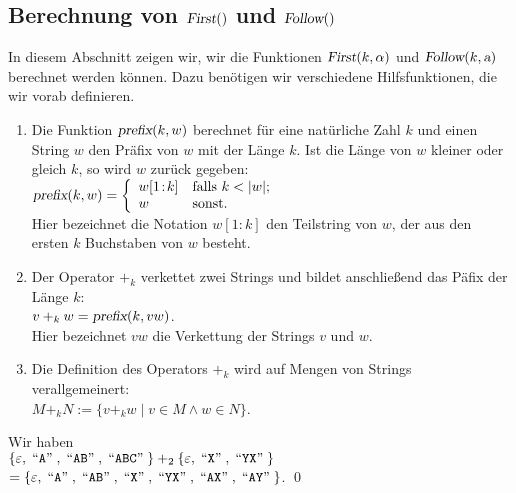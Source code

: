 \subsection{Berechnung von $\textsl{First}()$ und $\textsl{Follow}()$}
In diesem Abschnitt zeigen wir, wir die Funktionen $\textsl{First}(k, \alpha)$ und
$\textsl{Follow}(k, \textsl{a})$ berechnet werden k\"onnen.  Dazu ben\"otigen wir verschiedene
Hilfsfunktionen, die wir vorab definieren.
\begin{enumerate}
\item Die Funktion $\textsl{prefix}(k, w)$ berechnet f\"ur eine nat\"urliche Zahl $k$
      und einen String $w$ den Pr\"afix von $w$ mit der L\"ange $k$.  Ist die L\"ange von $w$
      kleiner oder gleich $k$, so wird $w$ zur\"uck gegeben:
      \\[0.2cm]
      \hspace*{1.3cm}
      $\textsl{prefix}(k, w) = \left\{
       \begin{array}{ll}
         w[1\!:\!k]  & \mbox{falls $k < |w|$;}  \\
         w       & \mbox{sonst.}
       \end{array}
       \right.
      $
      \\[0.2cm]
      Hier bezeichnet die Notation $w[1\!:\!k]$ den Teilstring von $w$, der 
      aus den ersten $k$ Buchstaben von $w$ besteht.
\item Der Operator $+_k$ verkettet zwei Strings und bildet anschlie{\ss}end das P\"afix der
      L\"ange $k$:
      \\[0.2cm]
      \hspace*{1.3cm}
      $v +_k w = \textsl{prefix}(k, vw)$.
      \\[0.2cm]
      Hier bezeichnet $vw$ die Verkettung der Strings $v$ und $w$.
\item Die Definition des Operators $+_k$ wird auf Mengen von Strings verallgemeinert:
      \\[0.2cm]
      \hspace*{1.3cm}
      $M +_k N := \{ v +_k w \mid v \in M \wedge w \in N \}$.
\end{enumerate}

\example
Wir haben
\\[0.2cm]
\hspace*{1.7cm}
$\{ \varepsilon, \;\mbox{``\texttt{A}''}\;, \;\mbox{``\texttt{AB}''}\;, \;\mbox{``\texttt{ABC}''}\; \} +_2 
 \{ \varepsilon, \;\mbox{``\texttt{X}''}\;, \;\mbox{``\texttt{YX}''}\; \} $
\\[0.2cm]
\hspace*{1.3cm}
$= \{ \varepsilon, \;\mbox{``\texttt{A}''}\;, \;\mbox{``\texttt{AB}''}\;, \;\mbox{``\texttt{X}''}\;, \;\mbox{``\texttt{YX}''}\;,
    \;\mbox{``\texttt{AX}''}\;, \;\mbox{``\texttt{AY}''}\; \}
$. \qed
\vspace*{0.2cm}

